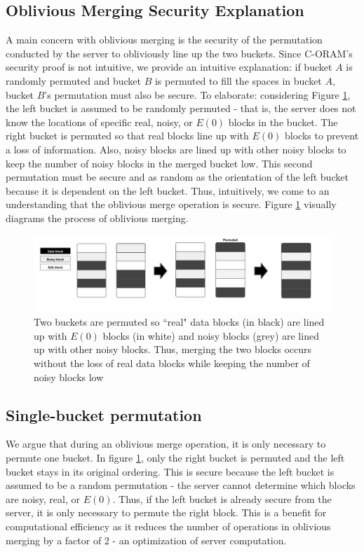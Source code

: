 \documentclass[12pt, oneside]{article}   	%
\begin{document}
\subsection{Oblivious Merging Security Explanation}
A main concern with oblivious merging is the security of the permutation conducted by the server to obliviously line up the two buckets. Since C-ORAM's security proof is not intuitive, we provide an intuitive explanation: if bucket $A$ is randomly permuted and bucket $B$ is permuted to fill the spaces in bucket $A$, bucket $B$'s permutation must also be secure. To elaborate: considering Figure \ref{fig:merge}, the left bucket is assumed to be randomly permuted - that is, the server does not know the locations of specific real, noisy, or $E (0)$ blocks in the bucket. The right bucket is permuted so that real blocks line up with $E (0)$ blocks to prevent a loss of information. Also, noisy blocks are lined up with other noisy blocks to keep the number of noisy blocks in the merged bucket low. This second permutation must be secure and as random as the orientation of the left bucket because it is dependent on the left bucket. Thus, intuitively, we come to an understanding that the oblivious merge operation is secure. Figure \ref{fig:merge} visually diagrams the process of oblivious merging.
\begin{figure}[h!]
  \includegraphics[width=\linewidth]{merge}
  \caption{Two buckets are permuted so ``real" data blocks (in black) are lined up with $E (0)$ blocks (in white) and noisy blocks (grey) are lined up with other noisy blocks. Thus, merging the two blocks occurs without the loss of real data blocks while keeping the number of noisy blocks low}
  \label{fig:merge}
\end{figure}

\subsection{Single-bucket permutation}
We argue that during an oblivious merge operation, it is only necessary to permute one bucket. In figure \ref{fig:merge}, only the right bucket is permuted and the left bucket stays in its original ordering. This is secure because the left bucket is assumed to be a random permutation - the server cannot determine which blocks are noisy, real, or $ E (0) $. Thus, if the left bucket is already secure from the server, it is only necessary to permute the right block. This is a benefit for computational efficiency as it reduces the number of operations in oblivious merging by a factor of 2 - an optimization of server computation.
\end{document}

